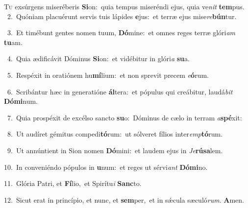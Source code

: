 \lettrine{\initial\textcolor{\initialcolor}{T}}{u} exsúrgens miseréberis \textbf{Si}\-on:~\star quia tempus miseréndi ejus, quia ve\textit{nit} \textbf{tem}\-pus.\\
{\numbfont\textcolor{\numbcolor}{~2.}}~Quóniam placuérunt servis tuis lápides \textbf{e}\-jus:~\star et terræ ejus mise\-\textit{re}\-\textbf{bún}tur.\par
{\numbfont\textcolor{\numbcolor}{~3.}}~Et timébunt gentes nomen tuum, \textbf{Dó}\-mine:~\star et omnes reges terræ glóri\textit{am} \textbf{tu}\-am.\par
{\numbfont\textcolor{\numbcolor}{~4.}}~Quia ædificávit Dóminus \textbf{Si}\-on:~\star et vidébitur in glóri\textit{a} \textbf{su}\-a.\par
{\numbfont\textcolor{\numbcolor}{~5.}}~Respéxit in oratiónem hu\-\textbf{mí}\-lium:~\star et non sprevit precem \textit{e}\-\textbf{ó}rum.\par
{\numbfont\textcolor{\numbcolor}{~6.}}~Scribántur hæc in generatióne \textbf{ál}\-tera:~\star et pópulus qui creábitur, laudá\textit{bit} \textbf{Dó}\-\textbf{mi}num.\par
{\numbfont\textcolor{\numbcolor}{~7.}}~Quia prospéxit de excélso sancto \textbf{su}\-o:~\star Dóminus de cælo in terram \textit{a}\-\textbf{spé}xit:\par
{\numbfont\textcolor{\numbcolor}{~8.}}~Ut audíret gémitus compedi\-\textbf{tó}\-rum:~\star ut sólveret fílios inter\-\textit{emp}\-\textbf{tó}rum.\par
{\numbfont\textcolor{\numbcolor}{~9.}}~Ut annúntient in Sion nomen \textbf{Dó}\-mini:~\star et laudem ejus in \textit{Je}\-\textbf{rú}\textbf{sa}lem.\par
{\numbfont\textcolor{\numbcolor}{10.}}~In conveniéndo pópulos in \textbf{u}\-num:~\star et reges ut sérvi\textit{ant} \textbf{Dó}\-\textbf{mi}no.\par
{\numbfont\textcolor{\numbcolor}{11.}}~Glória Patri, et \textbf{Fí}\-lio,~\star et Spirítu\textit{i} \textbf{Sanc}\-to.\par
{\numbfont\textcolor{\numbcolor}{12.}}~Sicut erat in princípio, et nunc, et \textbf{sem}\-per,~\star et in sǽcula sæculó\-\textit{rum}\-. \textbf{A}\-men.\par
